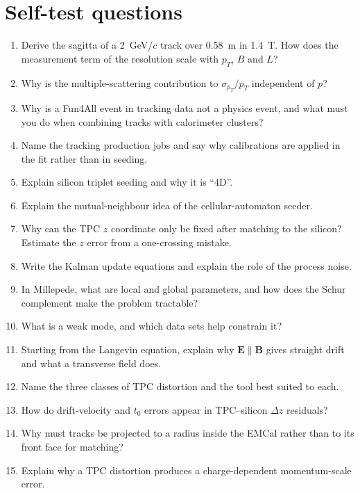 \documentclass[11pt,letterpaper]{article}
\begin{document}
\section{Self-test questions}
\begin{enumerate}[label=Q\arabic*.]
\item Derive the sagitta of a 2~GeV/$c$ track over 0.58~m in 1.4~T. How does the measurement term of the resolution scale with $p_T$, $B$ and $L$?
\item Why is the multiple-scattering contribution to $\sigma_{p_T}/p_T$ independent of $p$?
\item Why is a Fun4All event in tracking data not a physics event, and what must you do when combining tracks with calorimeter clusters?
\item Name the tracking production jobs and say why calibrations are applied in the fit rather than in seeding.
\item Explain silicon triplet seeding and why it is ``4D''.
\item Explain the mutual-neighbour idea of the cellular-automaton seeder.
\item Why can the TPC $z$ coordinate only be fixed after matching to the silicon? Estimate the $z$ error from a one-crossing mistake.
\item Write the Kalman update equations and explain the role of the process noise.
\item In Millepede, what are local and global parameters, and how does the Schur complement make the problem tractable?
\item What is a weak mode, and which data sets help constrain it?
\item Starting from the Langevin equation, explain why $\mathbf{E}\parallel\mathbf{B}$ gives straight drift and what a transverse field does.
\item Name the three classes of TPC distortion and the tool best suited to each.
\item How do drift-velocity and $t_0$ errors appear in TPC--silicon $\Delta z$ residuals?
\item Why must tracks be projected to a radius inside the EMCal rather than to its front face for matching?
\item Explain why a TPC distortion produces a charge-dependent momentum-scale error.
\end{enumerate}

\end{document}
